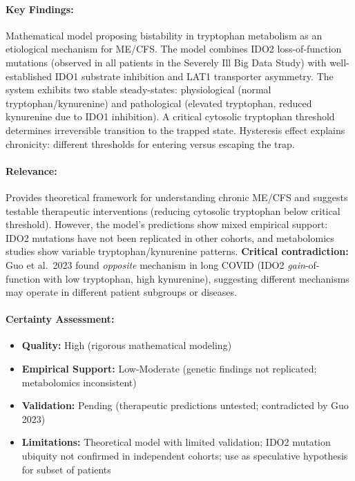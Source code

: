 \paragraph{Key Findings:}
Mathematical model proposing bistability in tryptophan metabolism as an etiological mechanism for ME/CFS. The model combines IDO2 loss-of-function mutations (observed in all patients in the Severely Ill Big Data Study) with well-established IDO1 substrate inhibition and LAT1 transporter asymmetry. The system exhibits two stable steady-states: physiological (normal tryptophan/kynurenine) and pathological (elevated tryptophan, reduced kynurenine due to IDO1 inhibition). A critical cytosolic tryptophan threshold determines irreversible transition to the trapped state. Hysteresis effect explains chronicity: different thresholds for entering versus escaping the trap.

\paragraph{Relevance:}
Provides theoretical framework for understanding chronic ME/CFS and suggests testable therapeutic interventions (reducing cytosolic tryptophan below critical threshold). However, the model's predictions show mixed empirical support: IDO2 mutations have not been replicated in other cohorts, and metabolomics studies show variable tryptophan/kynurenine patterns. \textbf{Critical contradiction:} Guo et al.\ 2023 found \emph{opposite} mechanism in long COVID (IDO2 \emph{gain}-of-function with low tryptophan, high kynurenine), suggesting different mechanisms may operate in different patient subgroups or diseases.

\paragraph{Certainty Assessment:}
\begin{itemize}
    \item \textbf{Quality:} High (rigorous mathematical modeling)
    \item \textbf{Empirical Support:} Low-Moderate (genetic findings not replicated; metabolomics inconsistent)
    \item \textbf{Validation:} Pending (therapeutic predictions untested; contradicted by Guo 2023)
    \item \textbf{Limitations:} Theoretical model with limited validation; IDO2 mutation ubiquity not confirmed in independent cohorts; use as speculative hypothesis for subset of patients
\end{itemize}

